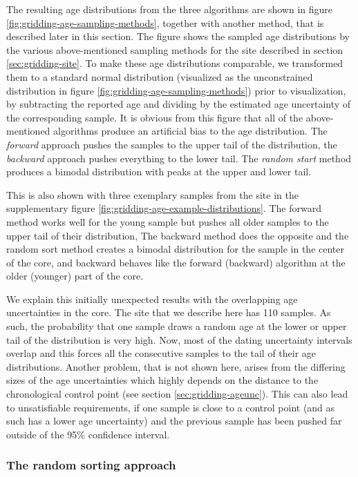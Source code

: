 \begin{refsection}
The resulting age distributions from the three algorithms are shown in figure \ref{fig:gridding-age-sampling-methods}, together with another method, that is described later in this section. The figure shows the sampled age distributions by the various above-mentioned sampling methods for the site described in section \ref{sec:gridding-site}. To make these age distributions comparable, we transformed them to a standard normal distribution (visualized as the unconstrained distribution in figure \ref{fig:gridding-age-sampling-methods}) prior to visualization, by subtracting the reported age and dividing by the estimated age uncertainty of the corresponding sample. It is obvious from this figure that all of the above-mentioned algorithms produce an artificial bias to the age distribution. The \textit{forward} approach pushes the samples to the upper tail of the distribution, the \textit{backward} approach pushes everything to the lower tail. The \textit{random start} method produces a bimodal distribution with peaks at the upper and lower tail.

This is also shown with three exemplary samples from the site in the supplementary figure \ref{fig:gridding-age-example-distributions}. The forward method works well for the young sample but pushes all older samples to the upper tail of their distribution, The backward method does the opposite and the random sort method creates a bimodal distribution for the sample in the center of the core, and backward behaves like the forward (backward) algorithm at the older (younger) part of the core.

We explain this initially unexpected results with the overlapping age uncertainties in the core. The site that we describe here has 110 samples. As such, the probability that one sample draws a random age at the lower or upper tail of the distribution is very high. Now, most of the dating uncertainty intervals overlap and this forces all the consecutive samples to the tail of their age distributions. Another problem, that is not shown here, arises from the differing sizes of the age uncertainties which highly depends on the distance to the chronological control point (see section \ref{sec:gridding-ageunc}). This can also lead to unsatisfiable requirements, if one sample is close to a control point (and as such has a lower age uncertainty) and the previous sample has been pushed far outside of the 95\% confidence interval.


\subsubsection{The random sorting approach}


\end{refsection}
